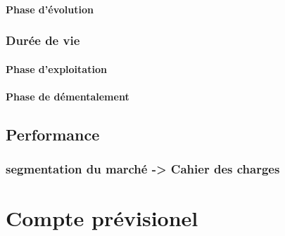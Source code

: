 			\paragraph{Phase d'évolution}
		\subsubsection{Durée de vie}
			\paragraph{Phase d'exploitation}
			\paragraph{Phase de démentalement}
	\subsection{Performance}
		\subsubsection{segmentation du marché -> Cahier des charges}	
\section{Compte prévisionel}


